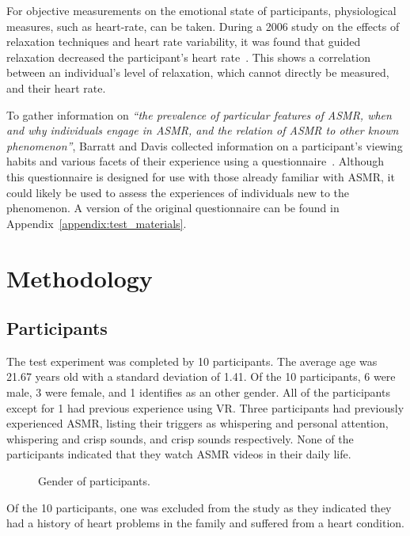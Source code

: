 \documentclass{sigchi}
\newcommand{\inlinequote}[1]{\textit{``#1''}}
\begin{document}
For objective measurements on the emotional state of participants, physiological measures, such as heart-rate, can be taken. During a 2006 study on the effects of relaxation techniques and heart rate variability, it was found that guided relaxation decreased the participant's heart rate~\cite{sarang2006effects}. This shows a correlation between an individual's level of relaxation, which cannot directly be measured, and their heart rate.

To gather information on \inlinequote{the prevalence of particular features of ASMR, when and why individuals engage in ASMR, and the relation of ASMR to other known phenomenon}, Barratt and Davis collected information on a participant's viewing habits and various facets of their experience using a questionnaire~\cite{barratt2015autonomous}. Although this questionnaire is designed for use with those already familiar with ASMR, it could likely be used to assess the experiences of individuals new to the phenomenon. A version of the original questionnaire can be found in Appendix~\ref{appendix:test_materials}. 



\section{Methodology}

\subsection{Participants}
The test experiment was completed by 10 participants. The average age was 21.67 years old with a standard deviation of 1.41. Of the 10 participants, 6 were male, 3 were female, and 1 identifies as an other gender. All of the participants except for 1 had previous experience using VR. Three participants had previously experienced ASMR, listing their triggers as whispering and personal attention, whispering and crisp sounds, and crisp sounds respectively. None of the participants indicated that they watch ASMR videos in their daily life.

\begin{figure}[htb]
\centering
{}
\caption{Gender of participants.}
\label{fig:gender}
\end{figure}

Of the 10 participants, one was excluded from the study as they indicated they had a history of heart problems in the family and suffered from a heart condition.
\end{document}
